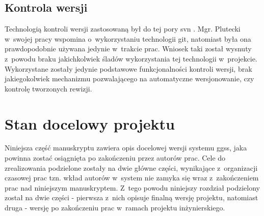 \subsection{Kontrola wersji}

Technologią kontroli wersji zastosowaną był do tej pory \gls*{svn} \cite{SVNMain}. Mgr. Plutecki w~swojej pracy wspomina o~wykorzystaniu technologii \gls*{git}, natomiast była ona prawdopodobnie używana jedynie w~trakcie prac. Wniosek taki został wysnuty z~powodu braku jakichkolwiek śladów wykorzystania tej technologii w~projekcie. Wykorzystane zostały jedynie podstawowe funkcjonalności kontroli wersji, brak jakiegokolwiek mechanizmu pozwalającego na automatyczne wersjonowanie, czy kontrolę tworzonych rewizji.



\section{Stan docelowy projektu}
\label{cha:docel}
Niniejsza część manuskryptu zawiera opis docelowej wersji systemu \gls*{ggss}, jaka powinna zostać osiągnięta po zakończeniu przez autorów prac. Cele do zrealizowania podzielone zostały na dwie główne części, wynikające z~organizacji czasowej prac tzn. wkład autorów w~system nie zamyka się wraz z~zakończeniem prac nad niniejszym manuskryptem. Z~tego powodu niniejszy rozdział podzielony został na dwie części - pierwsza z~nich opisuje finalną wersję projektu, natomiast druga - wersję po zakończeniu prac w~ramach projektu inżynierskiego.

